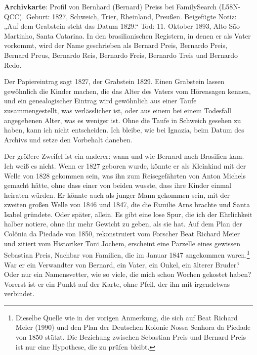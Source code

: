 \documentclass[
  ngerman,
  11pt,
  openany]{book}
\begin{document}
\begin{ficha}

\textbf{Archivkarte}: Profil von Bernhard (Bernard) Preiss bei
FamilySearch (L58N-QCC). Geburt: 1827, Schweich, Trier, Rheinland,
Preußen. Beigefügte Notiz: „Auf dem Grabstein steht das Datum 1829.``
Tod: 11. Oktober 1893, Alto São Martinho, Santa Catarina. In den
brasilianischen Registern, in denen er als Vater vorkommt, wird der Name
geschrieben als Bernard Preis, Bernardo Preis, Bernard Preus, Bernardo
Reis, Bernardo Freis, Bernardo Treis und Bernardo Redo.

\end{ficha}

Der Papiereintrag sagt 1827, der Grabstein 1829. Einen Grabstein lassen
gewöhnlich die Kinder machen, die das Alter des Vaters vom Hörensagen
kennen, und ein genealogischer Eintrag wird gewöhnlich aus einer Taufe
zusammengestellt, was verlässlicher ist, oder aus einem bei einem
Todesfall angegebenen Alter, was es weniger ist. Ohne die Taufe in
Schweich gesehen zu haben, kann ich nicht entscheiden. Ich bleibe, wie
bei Ignazia, beim Datum des Archivs und setze den Vorbehalt daneben.

Der größere Zweifel ist ein anderer: wann und wie Bernard nach Brasilien
kam. Ich weiß es nicht. Wenn er 1827 geboren wurde, könnte er als
Kleinkind mit der Welle von 1828 gekommen sein, was ihn zum
Reisegefährten von Anton Michels gemacht hätte, ohne dass einer von
beiden wusste, dass ihre Kinder einmal heiraten würden. Er könnte auch
als junger Mann gekommen sein, mit der zweiten großen Welle von 1846 und
1847, die die Familie Arns brachte und Santa Isabel gründete. Oder
später, allein. Es gibt eine lose Spur, die ich der Ehrlichkeit halber
notiere, ohne ihr mehr Gewicht zu geben, als sie hat. Auf dem Plan der
Colônia da Piedade von 1850, rekonstruiert vom Forscher Beat Richard
Meier und zitiert vom Historiker Toni Jochem, erscheint eine Parzelle
eines gewissen Sebastian Preis, Nachbar von Familien, die im Januar 1847
angekommen waren.\footnote{Dieselbe Quelle wie in der vorigen Anmerkung,
  die sich auf Beat Richard Meier (1990) und den Plan der Deutschen
  Kolonie Nossa Senhora da Piedade von 1850 stützt. Die Beziehung
  zwischen Sebastian Preis und Bernard Preis ist nur eine Hypothese, die
  zu prüfen bleibt.} War er ein Verwandter von Bernard, ein Vater, ein
Onkel, ein älterer Bruder? Oder nur ein Namensvetter, wie so viele, die
mich schon Wochen gekostet haben? Vorerst ist er ein Punkt auf der
Karte, ohne Pfeil, der ihn mit irgendetwas verbindet.
\end{document}
